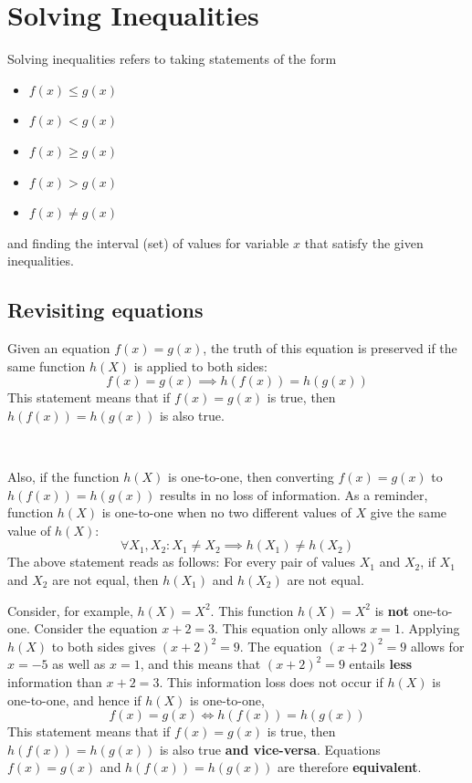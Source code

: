 \documentclass{article}
\begin{document}
\section*{Solving Inequalities}

Solving inequalities refers to taking statements of the form 
\begin{itemize}
\item \(f(x) \leq g(x)\)
\item \(f(x) < g(x)\)
\item \(f(x) \geq g(x)\)
\item \(f(x) > g(x)\)
\item \(f(x) \neq g(x)\) 
\end{itemize}
and finding the interval (set) of values for variable \(x\) that satisfy the given inequalities.


\subsection*{Revisiting equations} 

Given an equation \(f(x) = g(x)\), the truth of this equation is preserved if the same function \(h(X)\) is applied to both sides:
\[f(x) = g(x) \implies h(f(x)) = h(g(x))\]
This statement means that if \(f(x) = g(x)\) is true, then \(h(f(x)) = h(g(x))\) is also true.

~

Also, if the function \(h(X)\) is one-to-one, then converting \(f(x) = g(x)\) to \(h(f(x)) = h(g(x))\) results in no loss of information. As a reminder, function \(h(X)\) is one-to-one when no two different values of \(X\) give the same value of \(h(X)\):
\[\forall X_1, X_2 : X_1 \neq X_2 \implies h(X_1) \neq h(X_2)\]
The above statement reads as follows: For every pair of values \(X_1\) and \(X_2\), if \(X_1\) and \(X_2\) are not equal, then \(h(X_1)\) and \(h(X_2)\) are not equal.

Consider, for example, \(h(X) = X^2\). This function \(h(X) = X^2\) is {\bf not} one-to-one. Consider the equation \(x + 2 = 3\). This equation only allows \(x = 1\). Applying \(h(X)\) to both sides gives \((x + 2)^2 = 9\). The equation \((x + 2)^2 = 9\) allows for \(x = -5\) as well as \(x = 1\), and this means that \((x + 2)^2 = 9\) entails {\bf less} information than \(x + 2 = 3\). This information loss does not occur if \(h(X)\) is one-to-one, and hence if \(h(X)\) is one-to-one,
\[f(x) = g(x) \iff h(f(x)) = h(g(x))\]
This statement means that if \(f(x) = g(x)\) is true, then \(h(f(x)) = h(g(x))\) is also true {\bf and vice-versa}. Equations \(f(x) = g(x)\) and \(h(f(x)) = h(g(x))\) are therefore {\bf equivalent}.
\end{document}
